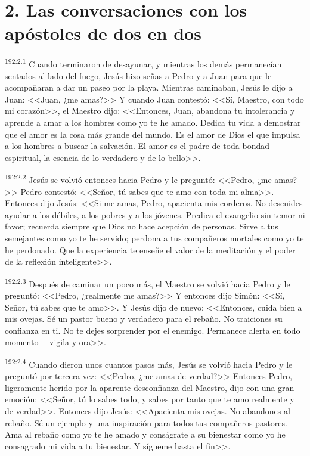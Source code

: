 \section*{2. Las conversaciones con los apóstoles de dos en dos}
\par 
\textsuperscript{192:2.1} Cuando terminaron de desayunar, y mientras los demás permanecían sentados al lado del fuego, Jesús hizo señas a Pedro y a Juan para que le acompañaran a dar un paseo por la playa. Mientras caminaban, Jesús le dijo a Juan: <<Juan, ¿me amas?>> Y cuando Juan contestó: <<Sí, Maestro, con todo mi corazón>>, el Maestro dijo: <<Entonces, Juan, abandona tu intolerancia y aprende a amar a los hombres como yo te he amado. Dedica tu vida a demostrar que el amor es la cosa más grande del mundo. Es el amor de Dios el que impulsa a los hombres a buscar la salvación. El amor es el padre de toda bondad espiritual, la esencia de lo verdadero y de lo bello>>.

\par 
\textsuperscript{192:2.2} Jesús se volvió entonces hacia Pedro y le preguntó: <<Pedro, ¿me amas?>> Pedro contestó: <<Señor, tú sabes que te amo con toda mi alma>>. Entonces dijo Jesús: <<Si me amas, Pedro, apacienta mis corderos. No descuides ayudar a los débiles, a los pobres y a los jóvenes. Predica el evangelio sin temor ni favor; recuerda siempre que Dios no hace acepción de personas. Sirve a tus semejantes como yo te he servido; perdona a tus compañeros mortales como yo te he perdonado. Que la experiencia te enseñe el valor de la meditación y el poder de la reflexión inteligente>>.

\par 
\textsuperscript{192:2.3} Después de caminar un poco más, el Maestro se volvió hacia Pedro y le preguntó: <<Pedro, ¿realmente me amas?>> Y entonces dijo Simón: <<Sí, Señor, tú sabes que te amo>>. Y Jesús dijo de nuevo: <<Entonces, cuida bien a mis ovejas. Sé un pastor bueno y verdadero para el rebaño. No traiciones su confianza en ti. No te dejes sorprender por el enemigo. Permanece alerta en todo momento ---vigila y ora>>.

\par 
\textsuperscript{192:2.4} Cuando dieron unos cuantos pasos más, Jesús se volvió hacia Pedro y le preguntó por tercera vez: <<Pedro, ¿me amas de verdad?>> Entonces Pedro, ligeramente herido por la aparente desconfianza del Maestro, dijo con una gran emoción: <<Señor, tú lo sabes todo, y sabes por tanto que te amo realmente y de verdad>>. Entonces dijo Jesús: <<Apacienta mis ovejas. No abandones al rebaño. Sé un ejemplo y una inspiración para todos tus compañeros pastores. Ama al rebaño como yo te he amado y conságrate a su bienestar como yo he consagrado mi vida a tu bienestar. Y sígueme hasta el fin>>.

